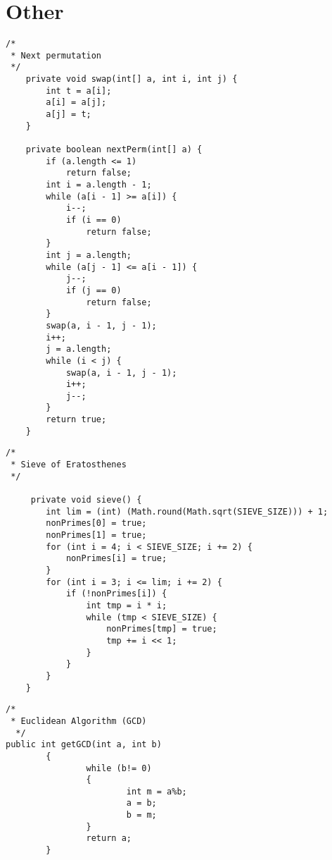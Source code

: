\documentclass{article}
\begin{document}
    \section*{Other}
    \begin{verbatim}
/*
 * Next permutation
 */
    private void swap(int[] a, int i, int j) {
        int t = a[i];
        a[i] = a[j];
        a[j] = t;
    }

    private boolean nextPerm(int[] a) {
        if (a.length <= 1)
            return false;
        int i = a.length - 1;
        while (a[i - 1] >= a[i]) {
            i--;
            if (i == 0)
                return false;
        }
        int j = a.length;
        while (a[j - 1] <= a[i - 1]) {
            j--;
            if (j == 0)
                return false;
        }
        swap(a, i - 1, j - 1);
        i++;
        j = a.length;
        while (i < j) {
            swap(a, i - 1, j - 1);
            i++;
            j--;
        }
        return true;
    }

    \end{verbatim}
    \begin{verbatim}
/*
 * Sieve of Eratosthenes
 */
 
     private void sieve() {
        int lim = (int) (Math.round(Math.sqrt(SIEVE_SIZE))) + 1;
        nonPrimes[0] = true;
        nonPrimes[1] = true;
        for (int i = 4; i < SIEVE_SIZE; i += 2) {
            nonPrimes[i] = true;
        }
        for (int i = 3; i <= lim; i += 2) {
            if (!nonPrimes[i]) {
                int tmp = i * i;
                while (tmp < SIEVE_SIZE) {
                    nonPrimes[tmp] = true;
                    tmp += i << 1;
                }
            }
        }
    }

    \end{verbatim}
    \begin{verbatim}
/*
 * Euclidean Algorithm (GCD)
  */
public int getGCD(int a, int b)
        {
                while (b!= 0)
                {
                        int m = a%b;
                        a = b;
                        b = m;
                }
                return a;
        }
\end{verbatim}
\end{document}
